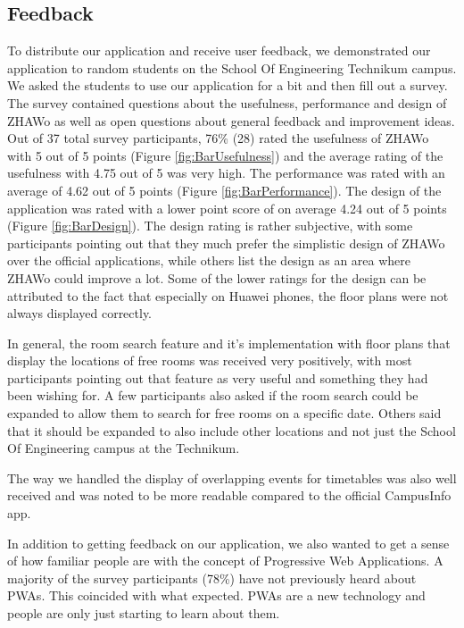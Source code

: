 \begin{markdown}
\section{Feedback} \label{feedback}

To distribute our application and receive user feedback, we demonstrated our application to random students on the School Of Engineering Technikum campus. We asked the students to use our application for a bit and then fill out a survey. The survey contained questions about the usefulness, performance and design of ZHAWo as well as open questions about general feedback and improvement ideas. Out of 37 total survey participants, 76\% (28) rated the usefulness of ZHAWo with 5 out of 5 points (Figure \ref{fig:BarUsefulness}) and the average rating of the usefulness with 4.75 out of 5 was very high. The performance was rated with an average of 4.62 out of 5 points (Figure \ref{fig:BarPerformance}). The design of the application was rated with a lower point score of on average 4.24 out of 5 points (Figure \ref{fig:BarDesign}). The design rating is rather subjective, with some participants pointing out that they much prefer the simplistic design of ZHAWo over the official applications, while others list the design as an area where ZHAWo could improve a lot. Some of the lower ratings for the design can be attributed to the fact that especially on Huawei phones, the floor plans were not always displayed correctly.

In general, the room search feature and it's implementation with floor plans that display the locations of free rooms was received very positively, with most participants pointing out that feature as very useful and something they had been wishing for. A few participants also asked if the room search could be expanded to allow them to search for free rooms on a specific date. Others said that it should be expanded to also include other locations and not just the School Of Engineering campus at the Technikum.

The way we handled the display of overlapping events for timetables was also well received and was noted to be more readable compared to the official CampusInfo app.

In addition to getting feedback on our application, we also wanted to get a sense of how familiar people are with the concept of Progressive Web Applications. A majority of the survey participants (78\%) have not previously heard about PWAs. This coincided with what expected. PWAs are a new technology and people are only just starting to learn about them.


\end{markdown}
